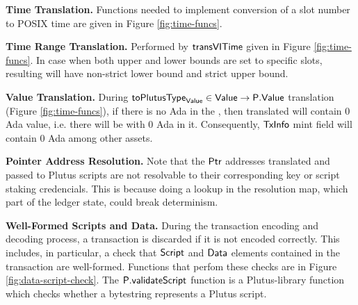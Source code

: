 \textbf{Time Translation.}
Functions needed to implement conversion of a slot number to POSIX time are
given in Figure \ref{fig:time-funcs}.

\textbf{Time Range Translation.}
Performed by $\mathsf{transVITime}$ given in Figure \ref{fig:time-funcs}.
In case when both upper and lower bounds are set to specific slots,
resulting  will have non-strict lower bound
and strict upper bound.

\textbf{Value Translation.}
During $\mathsf{toPlutusType}_{\mathsf{Value}} \in \mathsf{Value} \to \mathsf{P.Value}$ translation (Figure \ref{fig:time-funcs}),
if there is no Ada in the , then translated  will contain 0 Ada value,
i.e. there will be  with 0 Ada in it. Consequently, $\mathsf{TxInfo}$ mint field
 will contain 0 Ada  among other assets.

\textbf{Pointer Address Resolution. }
Note that the $\mathsf{Ptr}$ addresses translated and passed to Plutus scripts are
not resolvable to their corresponding key or script staking credencials. This
is because doing a lookup in the resolution map, which part of the ledger state,
could break determinism.

\textbf{Well-Formed Scripts and Data. }
During the transaction encoding and decoding process, a transaction is discarded if it is not
encoded correctly. This includes, in particular, a check that $\mathsf{Script}$ and $\mathsf{Data}$
elements contained in the transaction are well-formed. Functions that perfom these checks are
in Figure \ref{fig:data-script-check}. The $\mathsf{P.validateScript}$ function
is a Plutus-library function which checks whether a bytestring represents a
Plutus script.


